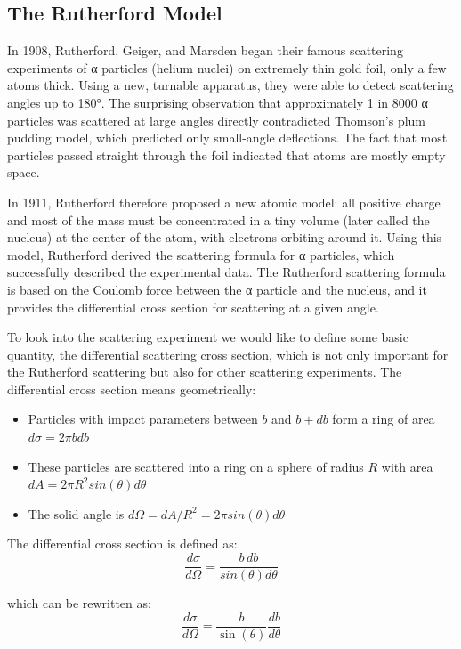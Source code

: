 \documentclass[
  a4paper,
]{book}
\providecommand{\tightlist}{%
  \setlength{\itemsep}{0pt}\setlength{\parskip}{0pt}}
\begin{document}
\subsection{The Rutherford Model}\label{the-rutherford-model}

In 1908, Rutherford, Geiger, and Marsden began their famous scattering
experiments of α particles (helium nuclei) on extremely thin gold foil,
only a few atoms thick. Using a new, turnable apparatus, they were able
to detect scattering angles up to 180°. The surprising observation that
approximately 1 in 8000 α particles was scattered at large angles
directly contradicted Thomson's plum pudding model, which predicted only
small-angle deflections. The fact that most particles passed straight
through the foil indicated that atoms are mostly empty space.

In 1911, Rutherford therefore proposed a new atomic model: all positive
charge and most of the mass must be concentrated in a tiny volume (later
called the nucleus) at the center of the atom, with electrons orbiting
around it. Using this model, Rutherford derived the scattering formula
for α particles, which successfully described the experimental data. The
Rutherford scattering formula is based on the Coulomb force between the
α particle and the nucleus, and it provides the differential cross
section for scattering at a given angle.

To look into the scattering experiment we would like to define some
basic quantity, the differential scattering cross section, which is not
only important for the Rutherford scattering but also for other
scattering experiments. The differential cross section means
geometrically:

\begin{itemize}
\tightlist
\item
  Particles with impact parameters between \(b\) and \(b + db\) form a
  ring of area \(d\sigma = 2\pi b db\)
\item
  These particles are scattered into a ring on a sphere of radius \(R\)
  with area \(dA = 2\pi R^2sin(\theta)d\theta\)
\item
  The solid angle is \(d\Omega = dA/R^2 = 2\pi sin(\theta)d\theta\)
\end{itemize}

The differential cross section is defined as: \[
\frac{d\sigma}{d\Omega} = \frac{b\,db}{sin(\theta)d\theta}
\]

which can be rewritten as: \[
\frac{d\sigma}{d\Omega} = \frac{b}{\sin(\theta)}\frac{db}{d\theta}
\]
\end{document}
